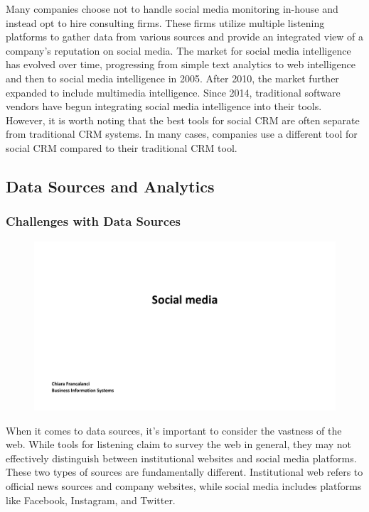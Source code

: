 Many companies choose not to handle social media monitoring in-house and
instead opt to hire consulting firms. These firms utilize multiple
listening platforms to gather data from various sources and provide an
integrated view of a company's reputation on social media. The market
for social media intelligence has evolved over time, progressing from
simple text analytics to web intelligence and then to social media
intelligence in 2005. After 2010, the market further expanded to include
multimedia intelligence. Since 2014, traditional software vendors have
begun integrating social media intelligence into their tools. However,
it is worth noting that the best tools for social CRM are often separate
from traditional CRM systems. In many cases, companies use a different
tool for social CRM compared to their traditional CRM tool.

\subsection{Data Sources and Analytics}\label{data-sources-and-analytics}

\subsubsection{Challenges with Data
    Sources}\label{challenges-with-data-sources}

\begin{figure}[!h]
    \centering
    \includegraphics[page=30, trim = 1cm 6.5cm 2cm 3.5cm, clip, width=\textwidth]{images/04 - Social_Media.pdf}
\end{figure}

When it comes to data sources, it's important to consider the vastness
of the web. While tools for listening claim to survey the web in
general, they may not effectively distinguish between institutional
websites and social media platforms. These two types of sources are
fundamentally different. Institutional web refers to official news
sources and company websites, while social media includes platforms like
Facebook, Instagram, and Twitter.

